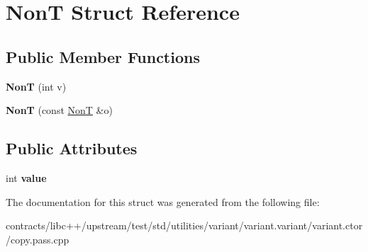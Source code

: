 \hypertarget{struct_non_t}{}\section{NonT Struct Reference}
\label{struct_non_t}
\subsection*{Public Member Functions}
\begin{DoxyCompactItemize}
\item 
\mbox{\label{struct_non_t_aa09b3ede0c688b67ffacbaad53a23e40}} 
{\bfseries NonT} (int v)
\item 
\mbox{\label{struct_non_t_aabcf7d1d5a4db438630fbeeeb2eb22d3}} 
{\bfseries NonT} (const \mbox{\hyperlink{struct_non_t}{NonT}} \&o)
\end{DoxyCompactItemize}
\subsection*{Public Attributes}
\begin{DoxyCompactItemize}
\item 
\mbox{\label{struct_non_t_a70dfe291b4468a08e988129ad675dfac}} 
int {\bfseries value}
\end{DoxyCompactItemize}


The documentation for this struct was generated from the following file\+:\begin{DoxyCompactItemize}
\item 
contracts/libc++/upstream/test/std/utilities/variant/variant.\+variant/variant.\+ctor/copy.\+pass.\+cpp\end{DoxyCompactItemize}
